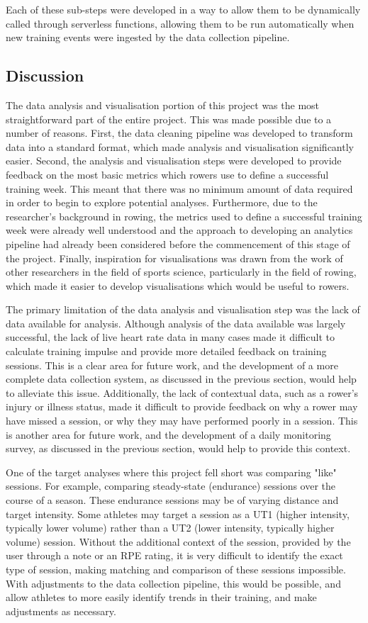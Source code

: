Each of these sub-steps were developed in a way to allow them to be dynamically called through serverless functions, allowing them to be run automatically when new training events were ingested by the data collection pipeline.

\subsection{Discussion}
The data analysis and visualisation portion of this project was the most straightforward part of the entire project. This was made possible due to a number of reasons. First, the data cleaning pipeline was developed to transform data into a standard format, which made analysis and visualisation significantly easier. Second, the analysis and visualisation steps were developed to provide feedback on the most basic metrics which rowers use to define a successful training week. This meant that there was no minimum amount of data required in order to begin to explore potential analyses. Furthermore, due to the researcher's background in rowing, the metrics used to define a successful training week were already well understood and the approach to developing an analytics pipeline had already been considered before the commencement of this stage of the project. Finally, inspiration for visualisations was drawn from the work of other researchers in the field of sports science, particularly in the field of rowing, which made it easier to develop visualisations which would be useful to rowers.

The primary limitation of the data analysis and visualisation step was the lack of data available for analysis. Although analysis of the data available was largely successful, the lack of live heart rate data in many cases made it difficult to calculate training impulse and provide more detailed feedback on training sessions. This is a clear area for future work, and the development of a more complete data collection system, as discussed in the previous section, would help to alleviate this issue. Additionally, the lack of contextual data, such as a rower's injury or illness status, made it difficult to provide feedback on why a rower may have missed a session, or why they may have performed poorly in a session. This is another area for future work, and the development of a daily monitoring survey, as discussed in the previous section, would help to provide this context. 

One of the target analyses where this project fell short was comparing "like" sessions. For example, comparing steady-state (endurance) sessions over the course of a season. These endurance sessions may be of varying distance and target intensity. Some athletes may target a session as a UT1 (higher intensity, typically lower volume) rather than a UT2 (lower intensity, typically higher volume) session. Without the additional context of the session, provided by the user through a note or an RPE rating, it is very difficult to identify the exact type of session, making matching and comparison of these sessions impossible. With adjustments to the data collection pipeline, this would be possible, and allow athletes to more easily identify trends in their training, and make adjustments as necessary.


